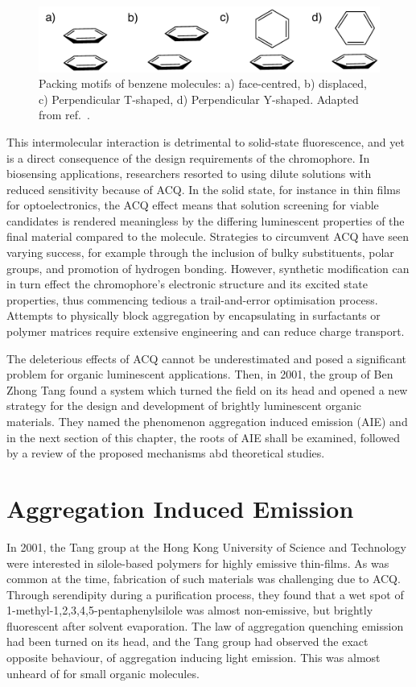 \begin{figure}[H]
\centering
  \includegraphics[width=0.7\linewidth]{Intro/Stacking.pdf}
  \caption[Benzene Stacking Motifs]{Packing motifs of benzene molecules: a) face-centred, b) displaced, c) Perpendicular T-shaped, d) Perpendicular Y-shaped. Adapted from ref.~.}
  \label{figure: Benzene_Stacking}
\end{figure}


This intermolecular interaction is detrimental to solid-state fluorescence, and yet is a direct consequence of the design requirements of the chromophore. In biosensing applications, researchers resorted to using dilute solutions with reduced sensitivity because of ACQ.\cite{Thomas2007,Kwok2015} In the solid state, for instance in thin films for optoelectronics, the ACQ effect means that solution screening for viable candidates is rendered meaningless by the differing luminescent properties of the final material compared to the molecule. Strategies to circumvent ACQ have seen varying success, for example through the inclusion of bulky substituents, polar groups, and promotion of hydrogen bonding.\cite{Hong2009,Zhang2013,Mei2014,Mei2015} However, synthetic modification can in turn effect the chromophore's electronic structure and its excited state properties, thus commencing tedious a trail-and-error optimisation process. Attempts to physically block aggregation by encapsulating in surfactants or polymer matrices require extensive engineering and can reduce charge transport.\cite{Hong2009,Chen2000,Lee2013} 

The deleterious effects of ACQ cannot be underestimated and posed a significant problem for organic luminescent applications. Then, in 2001, the group of Ben Zhong Tang found a system which turned the field on its head and opened a new strategy for the design and development of brightly luminescent organic materials. They named the phenomenon aggregation induced emission (AIE) and in the next section of this chapter, the roots of AIE shall be examined, followed by a review of the proposed mechanisms abd theoretical studies.
\section{Aggregation Induced Emission}\label{section: lom AIE}
In 2001, the Tang group at the Hong Kong University of Science and Technology were interested in silole-based polymers for highly emissive thin-films. As was common at the time, fabrication of such materials was challenging due to ACQ. Through serendipity during a purification process, they found that a wet spot of 1-methyl-1,2,3,4,5-pentaphenylsilole was almost non-emissive, but brightly fluorescent after solvent evaporation.\cite{Luo2001} The law of aggregation quenching emission had been turned on its head, and the Tang group had observed the exact opposite behaviour, of aggregation inducing light emission. This was almost unheard of for small organic molecules. 

